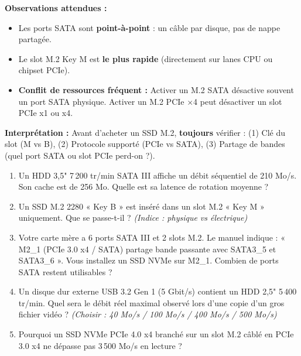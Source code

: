 \documentclass[11pt]{article}
\begin{document}
\begin{experience}
\textbf{Observations attendues :}
\begin{itemize}
    \item Les ports SATA sont \textbf{point-à-point} : un câble par disque, pas de nappe partagée.
    \item Le slot M.2 Key M est \textbf{le plus rapide} (directement sur lanes CPU ou chipset PCIe).
    \item \textbf{Conflit de ressources fréquent :} Activer un M.2 SATA désactive souvent un port SATA physique. Activer un M.2 PCIe $\times$4 peut désactiver un slot PCIe x1 ou x4.
\end{itemize}

\textbf{Interprétation :} Avant d'acheter un SSD M.2, \textbf{toujours} vérifier : (1) Clé du slot (M vs B), (2) Protocole supporté (PCIe vs SATA), (3) Partage de bandes (quel port SATA ou slot PCIe perd-on ?).
\end{experience}

\begin{exercice}
\begin{enumerate}
    \item Un HDD 3,5" 7\,200 tr/min SATA III affiche un débit séquentiel de 210 Mo/s. Son cache est de 256 Mo. Quelle est sa latence de rotation moyenne ?
    \item Un SSD M.2 2280 « Key B » est inséré dans un slot M.2 « Key M » uniquement. Que se passe-t-il ? \textit{(Indice : physique vs électrique)}
    \item Votre carte mère a 6 ports SATA III et 2 slots M.2. Le manuel indique : « M2\_1 (PCIe 3.0 x4 / SATA) partage bande passante avec SATA3\_5 et SATA3\_6 ». Vous installez un SSD NVMe sur M2\_1. Combien de ports SATA restent utilisables ?
    \item Un disque dur externe USB 3.2 Gen 1 (5 Gbit/s) contient un HDD 2,5" 5\,400 tr/min. Quel sera le débit réel maximal observé lors d'une copie d'un gros fichier vidéo ? \textit{(Choisir : 40 Mo/s / 100 Mo/s / 400 Mo/s / 500 Mo/s)}
    \item Pourquoi un SSD NVMe PCIe 4.0 x4 branché sur un slot M.2 câblé en PCIe 3.0 x4 ne dépasse pas 3\,500 Mo/s en lecture ?
\end{enumerate}
\end{exercice}
\end{document}
